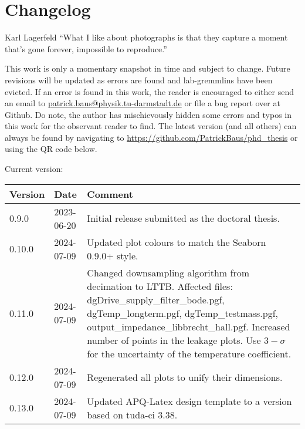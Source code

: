 \chapter{Changelog}
\begin{chapquote}{Karl Lagerfeld}
``What I like about photographs is that they capture a moment that’s gone forever, impossible to reproduce.''
\end{chapquote}

This work is only a momentary snapshot in time and subject to change. Future revisions will be updated as errors are found and lab-gremmlins have been evicted. If an error is found in this work, the reader is encouraged to either send an email to \url{patrick.baus@physik.tu-darmstadt.de} or file a bug report over at Github. Do note, the author has mischievously hidden some errors and typos in this work for the observant reader to find. The latest version (and all others) can always be found by navigating to \url{https://github.com/PatrickBaus/phd_thesis} or using the QR code below.
\begin{center}
\end{center}

\begin{center}
    \begin{minipage}{0.8\linewidth}
        \centering
        Current version: \versionNumber
    \end{minipage}%
\end{center}

\begin{table}[h]
    \centering
    \begin{tabularx}{0.95\textwidth}{ll>{\raggedright\arraybackslash}X}
        Version& Date& Comment\\
        \hline
        0.9.0 &2023-06-20 & Initial release submitted as the doctoral thesis.\\
        0.10.0 &2024-07-09 & Updated plot colours to match the Seaborn 0.9.0+ style.\\
        0.11.0 &2024-07-09 & Changed downsampling algorithm from decimation to LTTB. Affected files: dgDrive\_supply\_filter\_bode.pgf, dgTemp\_longterm.pgf, dgTemp\_testmass.pgf, output\_impedance\_libbrecht\_hall.pgf. Increased number of points in the leakage plots. Use $3-\sigma$ for the uncertainty of the temperature coefficient.\\
        0.12.0 &2024-07-09 & Regenerated all plots to unify their dimensions.\\
        0.13.0 &2024-07-09 & Updated APQ-Latex design template to a version based on tuda-ci 3.38.
    \end{tabularx}
\end{table}
